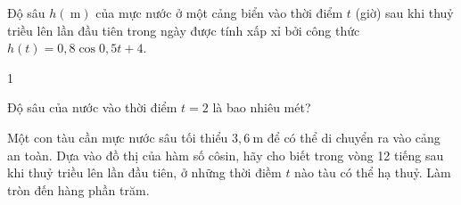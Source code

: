 \begin{bt}
	Độ sâu $h(\mathrm{~m})$ của mực nước ở một cảng biển vào thời điểm $t$ (giờ) sau khi thuỷ triều lên lần đầu tiên trong ngày được tính xấp xỉ bởi công thức $h(t)=0,8 \cos 0,5 t+4$.
	\begin{enumEX}[a)]{1}
		\item  Độ sâu của nước vào thời điểm $t=2$ là bao nhiêu mét?
		\item  Một con tàu cần mực nước sâu tối thiểu $3,6 \mathrm{~m}$ để có thể di chuyển ra vào cảng an toàn. Dựa vào đồ thị của hàm số côsin, hãy cho biết trong vòng 12 tiếng sau khi thuỷ triều lên lần đầu tiên, ở những thời điềm $t$ nào tàu có thể hạ thuỷ. Làm tròn đến hàng phần trăm.
	\end{enumEX}
\end{bt} 